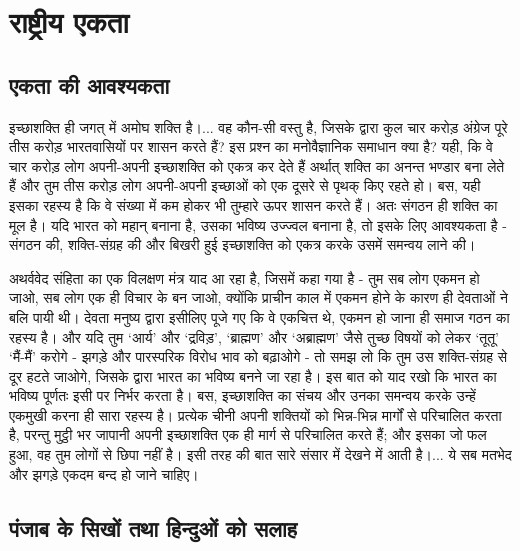 
\chapter{राष्ट्रीय एकता }

\indentsecionsintoc



\section*{एकता की आवश्यकता}


इच्छाशक्ति ही जगत् में अमोघ शक्ति है।... वह कौन-सी वस्तु है, जिसके द्वारा कुल चार करोड़ अंग्रेज पूरे तीस करोड़ भारतवासियों पर शासन करते हैं? इस प्रश्न का मनोवैज्ञानिक समाधान क्या है? यही, कि वे चार करोड़ लोग अपनी-अपनी इच्छाशक्ति को एकत्र कर देते हैं अर्थात् शक्ति का अनन्त भण्डार बना लेते हैं और तुम तीस करोड़ लोग अपनी-अपनी इच्छाओं को एक दूसरे से पृथक् किए रहते हो। बस, यही इसका रहस्य है कि वे संख्या में कम होकर भी तुम्हारे ऊपर शासन करते हैं। अतः संगठन ही शक्ति का मूल है। यदि भारत को महान् बनाना है, उसका भविष्य उज्ज्वल बनाना है, तो इसके लिए आवश्यकता है - संगठन की, शक्ति-संग्रह की और बिखरी हुई इच्छाशक्ति को एकत्र करके उसमें समन्वय लाने की। 

अथर्ववेद संहिता का एक विलक्षण मंत्र याद आ रहा है, जिसमें कहा गया है - तुम सब लोग एकमन हो जाओ, सब लोग एक ही विचार के बन जाओ, क्योंकि प्राचीन काल में एकमन होने के कारण ही देवताओं ने बलि पायी थी। देवता मनुष्य द्वारा इसीलिए पूजे गए कि वे एकचित्त थे, एकमन हो जाना ही समाज गठन का रहस्य है। और यदि तुम ‘आर्य’ और ‘द्रविड़’, ‘ब्राह्मण’ और ‘अब्राह्मण’ जैसे तुच्छ विषयों को लेकर ‘तूतू’ ‘मैं-मैं’ करोगे - झगड़े और पारस्परिक विरोध भाव को बढ़ाओगे - तो समझ लो कि तुम उस शक्ति-संग्रह से दूर हटते जाओगे, जिसके द्वारा भारत का भविष्य बनने जा रहा है। इस बात को याद रखो कि भारत का भविष्य पूर्णतः इसी पर निर्भर करता है। बस, इच्छाशक्ति का संचय और उनका समन्वय करके उन्हें एकमुखी करना ही सारा रहस्य है। प्रत्येक चीनी अपनी शक्तियों को भिन्न-भिन्न मार्गों से परिचालित करता है, परन्तु मुट्ठी भर जापानी अपनी इच्छाशक्ति एक ही मार्ग से परिचालित करते हैं; और इसका जो फल हुआ, वह तुम लोगों से छिपा नहीं है। इसी तरह की बात सारे संसार में देखने में आती है।... ये सब मतभेद और झगड़े एकदम बन्द हो जाने चाहिए।


\section*{पंजाब के सिखों तथा हिन्दुओं को सलाह}

